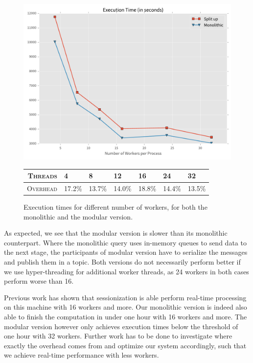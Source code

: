 \begin{figure}[htb]
  \centering
    \includegraphics[width=1\textwidth]{figures/evaluation/times}

    {\footnotesize
    \vspace{1em}
    \begin{tabularx}{\textwidth}{ rXXXXXX }
      \hline 
      \textsc{Threads} & 4 & 8 & 12 & 16 & 24 & 32 \\
      \hline 
      \textsc{Overhead} & 17.2\%&13.7\%&14.0\%&18.8\%&14.4\%&13.5\% \\
      \hline
    \end{tabularx}
    }
    \caption[Execution times for different number of workers]{
    Execution times for different number of workers, for both the monolithic
    and the modular version.}
    \label{fig:times}
\end{figure}

As expected, we see that the modular version is slower than its monolithic
counterpart. Where the monolithic query uses in-memory queues to send data
to the next stage, the participants of modular version have to serialize
the messages and publish them in a topic. Both versions do not necessarily
perform better if we use hyper-threading for additional worker threads,
as 24 workers in both cases perform worse than 16.

Previous work has shown that sessionization is able perform real-time processing
on this machine with 16 workers and more. Our monolithic version is indeed also
able to finish the computation in under one hour with 16 workers and more.
The modular version however only achieves execution times below the threshold
of one hour with 32 workers. Further work has to be done to investigate where
exactly the overhead comes from and optimize our system accordingly, such that
we achieve real-time performance with less workers.

